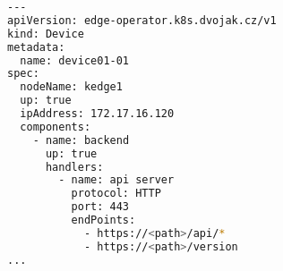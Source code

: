 \begin{lstfloat}
\begin{lstlisting}[language=bash, caption={Ukázka CRD device}, label={sample:device}]
---
apiVersion: edge-operator.k8s.dvojak.cz/v1
kind: Device
metadata:
  name: device01-01
spec:
  nodeName: kedge1
  up: true
  ipAddress: 172.17.16.120
  components:
    - name: backend
      up: true
      handlers:
        - name: api server
          protocol: HTTP
          port: 443
          endPoints:
            - https://<path>/api/*
            - https://<path>/version
...
\end{lstlisting}
\end{lstfloat}